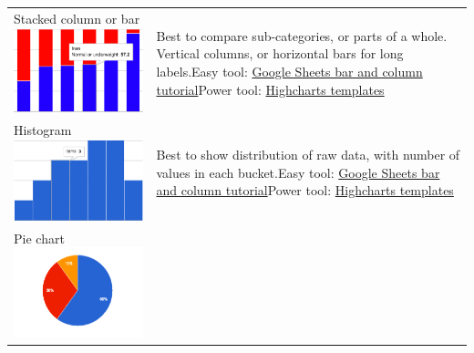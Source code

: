 \documentclass[
  english,
]{book}
\begin{document}
\begin{longtable}[]{@{}ll@{}}
\begin{minipage}[t]{0.47\columnwidth}
Stacked column or bar \includegraphics{images/05-chart/chart-stacked-column.png}\strut
\end{minipage} & \begin{minipage}[t]{0.47\columnwidth}\raggedright
Best to compare sub-categories, or parts of a whole. Vertical columns, or horizontal bars for long labels.Easy tool: \href{column-bar-google}{Google Sheets bar and column tutorial}Power tool: \href{highcharts}{Highcharts templates}\strut
\end{minipage}\tabularnewline
\begin{minipage}[t]{0.47\columnwidth}\raggedright
Histogram \includegraphics{images/05-chart/chart-histogram.png}\strut
\end{minipage} & \begin{minipage}[t]{0.47\columnwidth}\raggedright
Best to show distribution of raw data, with number of values in each bucket.Easy tool: \href{column-bar-google}{Google Sheets bar and column tutorial}Power tool: \href{highcharts}{Highcharts templates}\strut
\end{minipage}\tabularnewline
\begin{minipage}[t]{0.47\columnwidth}\raggedright
Pie chart \includegraphics{images/05-chart/chart-pie.png}\strut

\end{minipage}
\end{longtable}
\end{document}
